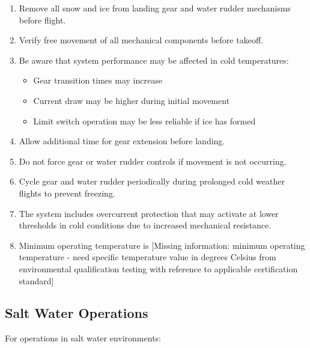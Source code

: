 \documentclass[12pt,a4paper,twoside,openright]{book}
\begin{document}
\begin{enumerate}
    \item Remove all snow and ice from landing gear and water rudder mechanisms before flight.
    \item Verify free movement of all mechanical components before takeoff.
    \item Be aware that system performance may be affected in cold temperatures:
\begin{itemize}
        \item Gear transition times may increase
        \item Current draw may be higher during initial movement
        \item Limit switch operation may be less reliable if ice has formed
\end{itemize}
    \item Allow additional time for gear extension before landing.
    \item Do not force gear or water rudder controls if movement is not occurring.
    \item Cycle gear and water rudder periodically during prolonged cold weather flights to prevent freezing.
    \item The system includes overcurrent protection that may activate at lower thresholds in cold conditions due to increased mechanical resistance.
    \item Minimum operating temperature is {\color{red}[Missing information: minimum operating temperature - need specific temperature value in degrees Celsius from environmental qualification testing with reference to applicable certification standard]}
\end{enumerate}

\subsection{Salt Water Operations}

For operations in salt water environments:
\end{document}
